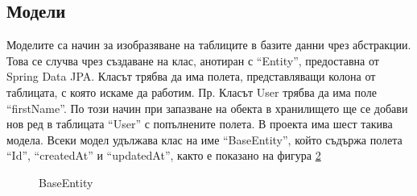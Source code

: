      \begin{figure}[h]
        \centering
        \caption{}
        \label{fig:user_details_service}
    \end{figure}
    
    
    
    \subsection{Модели}
    Моделите са начин за изобразяване на таблиците в базите данни чрез абстракции. Това се случва чрез създаване на клас, анотиран с ``Entity'', предоставна от Spring Data JPA. Класът трябва да има полета, представляващи колона от таблицата, с която искаме да работим. 
    Пр. Класът User трябва да има поле ``firstName''. По този начин при запазване на обекта в хранилището ще се добави нов ред в таблицата ``User'' с попълнените полета. В проекта има шест такива модела.
    Всеки модел удължава клас на име ``BaseEntity'', който съдържа полета ``Id'', ``createdAt'' и ``updatedAt'', както е показано на фигура \ref{fig:base_entityl}
    
    \begin{figure}
        \centering
        \caption{BaseEntity}
        \label{fig:base_entityl}
    \end{figure}
    
